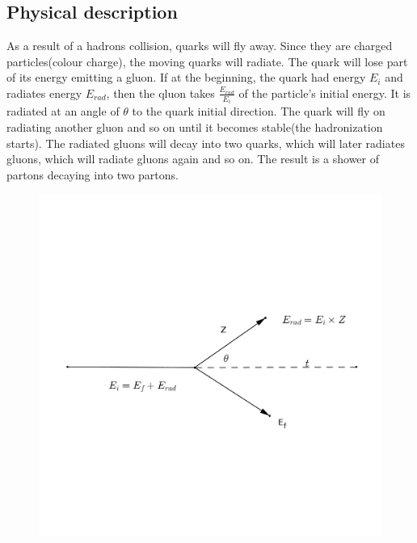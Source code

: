\subsection{Physical description}
\noindent As a result of a hadrons collision, quarks will fly away. Since they are charged particles(colour charge), the moving quarks will radiate. The quark will lose part of its energy emitting a gluon. If at the beginning, the quark had energy $E_i$ and radiates energy $E_{rad}$, then the qluon takes $\frac{E_{rad}}{E_i}$ of the particle's initial energy. It is radiated at an angle of $\theta$ to the quark initial direction. The quark will fly on radiating another gluon and so on until it becomes stable(the hadronization starts). The radiated gluons will decay into two quarks, which will later radiates gluons,  which will radiate gluons again and so on. The result is a shower of partons decaying into two partons. 
\begin{figure}[hbtp]
\centering
\includegraphics[scale=.15]{images/tt.png}
\end{figure}


